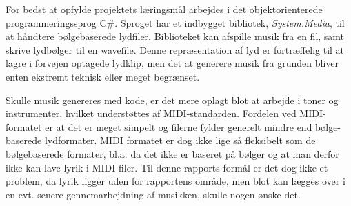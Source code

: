 For bedst at opfylde projektets læringsmål arbejdes i det objektorienterede programmeringssprog C\#.
Sproget har et indbygget bibliotek, \emph{System.Media}, til at håndtere bølgebaserede lydfiler. Biblioteket kan afspille musik fra en fil, samt skrive lydbølger til en wavefile. Denne repræsentation af lyd er fortræffelig til at lagre i forvejen optagede lydklip, men det at generere musik fra grunden bliver enten ekstremt teknisk eller meget begrænset. \cite{CitationNeeded}

Skulle musik genereres med kode, er det mere oplagt blot at arbejde i toner og instrumenter, hvilket understøttes af MIDI-standarden.  Fordelen ved MIDI-formatet er at det er meget simpelt og filerne fylder generelt mindre end bølge-baserede lydformater. MIDI formatet er dog ikke lige så fleksibelt som de bølgebaserede formater, bl.a. da det ikke er baseret på bølger og at man derfor ikke kan lave lyrik i MIDI filer. Til denne rapports formål er det dog ikke et problem, da lyrik ligger uden for rapportens område, men blot kan lægges over i en evt. senere gennemarbejdning af musikken, skulle nogen ønske det.

